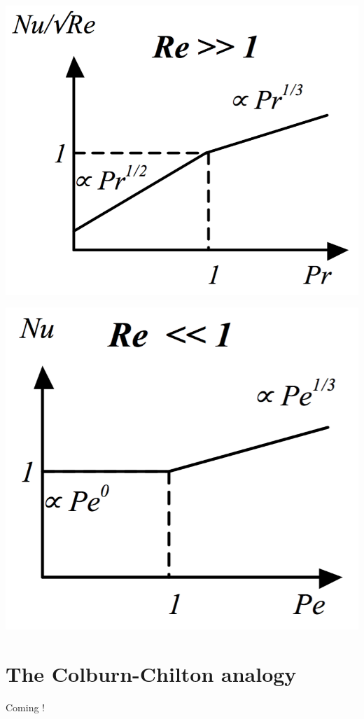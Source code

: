 		\begin{minipage}{0.5\textwidth}
			\begin{flushright}
				\includegraphics[scale=0.3]{ch5/9}
			\end{flushright}
		\end{minipage}
		\begin{minipage}{0.5\textwidth}
				\includegraphics[scale=0.3]{ch5/10}
		\end{minipage}
		
\section{The Colburn-Chilton analogy}
	Coming !